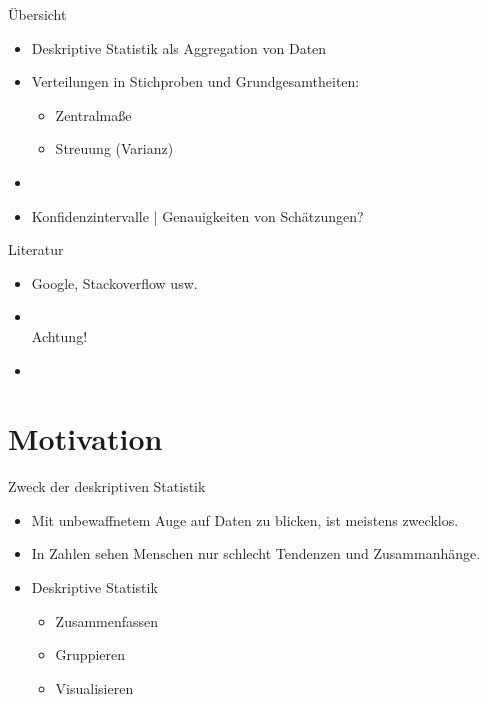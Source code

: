 
\begin{frame}
  {Übersicht}
  \begin{itemize}[<+->]
    \item Deskriptive Statistik als \alert{Aggregation von Daten}
      \Halbzeile
    \item Verteilungen in Stichproben und Grundgesamtheiten:
      \begin{itemize}
	\item Zentralmaße
	\item Streuung (Varianz)
      \end{itemize}
    \item {}
      \Halbzeile
    \item \alert{Konfidenzintervalle} | Genauigkeiten von Schätzungen?
  \end{itemize}
\end{frame}

\begin{frame}
  {Literatur}
  \begin{itemize}
    \item Google, Stackoverflow usw.
      \Zeile
    \item \citet{GravetterWallnau2007}\\
      Achtung! 
      \Halbzeile
    \item \citet{Bortz2010}
  \end{itemize}
\end{frame}

\section{Motivation}

\begin{frame}
  {Zweck der deskriptiven Statistik}
  \begin{itemize}[<+->]
    \item Mit unbewaffnetem Auge auf Daten zu blicken, ist meistens zwecklos.
      \Halbzeile
    \item In Zahlen sehen Menschen nur schlecht Tendenzen und Zusammanhänge.
      \Zeile
    \item Deskriptive Statistik
      \begin{itemize}[<+->]
        \item \alert{Zusammenfassen}
        \item \alert{Gruppieren}
        \item \alert{Visualisieren}
      \end{itemize}
  \end{itemize}
\end{frame}


